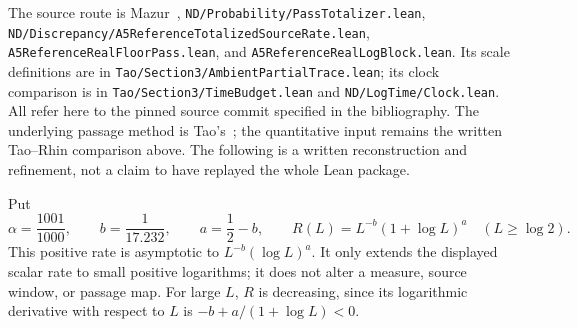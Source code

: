 \documentclass[11pt]{article}
\theoremstyle{remark}\newtheorem{remark}[proposition]{Remark}
\begin{document}
The source route is Mazur~\cite{Mazur2026v2},
\texttt{ND/Probability/PassTotalizer.lean},
\texttt{ND/Discrepancy/A5ReferenceTotalizedSourceRate.lean},
\texttt{A5ReferenceRealFloorPass.lean}, and
\texttt{A5ReferenceRealLogBlock.lean}. Its scale definitions are in
\texttt{Tao/Section3/AmbientPartialTrace.lean}; its clock comparison is
in \texttt{Tao/Section3/TimeBudget.lean} and
\texttt{ND/LogTime/Clock.lean}. All refer here to the pinned source
commit specified in the bibliography. The underlying passage method
is Tao's~\cite{Tao7}; the quantitative input remains the written
Tao--Rhin comparison above. The following is a written reconstruction
and refinement, not a claim to have replayed the whole Lean package.

Put
\[
 \alpha=\frac{1001}{1000},\qquad b=\frac1{17.232},\qquad
 a=\frac12-b,\qquad
 R(L)=L^{-b}(1+\log L)^a\quad(L\ge\log2).
\]
This positive rate is asymptotic to \(L^{-b}(\log L)^a\).
It only extends the displayed scalar rate to small positive logarithms;
it does not alter a measure, source window, or passage map.
For large \(L\), \(R\) is decreasing, since its logarithmic derivative
with respect to \(L\) is \(-b+a/(1+\log L)<0\).
\end{document}
